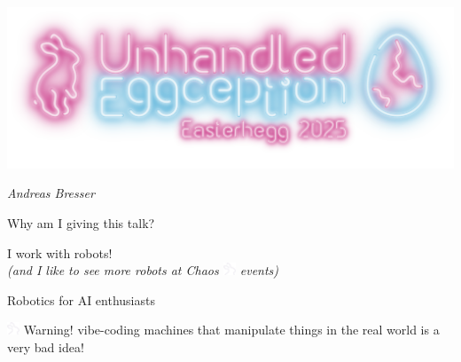 \documentclass[aspectratio=169]{beamer}
\begin{document}

\begin{frame}{}
    \centering
    \includegraphics[width=.7\textwidth]{figures/logo_easterhegg.png}
    \vspace{1cm}

    \textit{Andreas Bresser}
\end{frame}

\begin{frame}{Why am I giving this talk?}
        \centering
        
        I work with robots!\\
        \textit{(and I like to see more robots at Chaos \includegraphics[height=1em]{figures/hare_head_darkmode.pdf} events)}
\end{frame}


\begin{frame}{Robotics for AI enthusiasts}
    \centering
    \begin{minipage}{0.6\textwidth}
        \begin{alertblock}{\includegraphics[height=1em]{figures/hare_head_darkmode.pdf} Warning!}
            vibe-coding machines that manipulate things in the real world is a very bad idea!
        \end{alertblock}
\end{minipage}
\end{frame}
\end{document}
